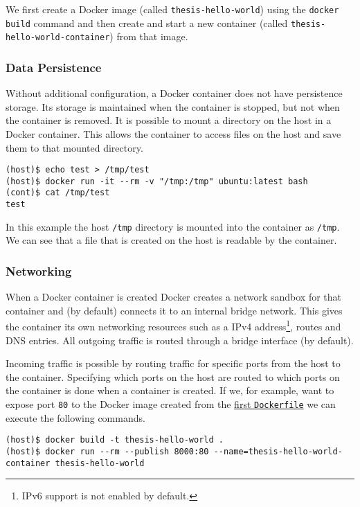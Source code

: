 We first create a Docker image (called \lstinline{thesis-hello-world}) using the \lstinline{docker build} command and then create and start a new container (called \lstinline{thesis-hello-world-container}) from that image.

\subsubsection{Data Persistence}
Without additional configuration, a Docker container does not have persistence storage. Its storage is maintained when the container is stopped, but not when the container is removed. It is possible to mount a directory on the host in a Docker container. This allows the container to access files on the host and save them to that mounted directory.

\begin{lstlisting}[caption={Bind mount example},label={docker:bindmount},captionpos=b]
(host)$ echo test > /tmp/test
(host)$ docker run -it --rm -v "/tmp:/tmp" ubuntu:latest bash
(cont)$ cat /tmp/test
test
\end{lstlisting}

In this example the host \lstinline{/tmp} directory is mounted into the container as \lstinline{/tmp}. We can see that a file that is created on the host is readable by the container.

\subsubsection{Networking}
When a Docker container is created Docker creates a network sandbox for that container and (by default) connects it to an internal bridge network. This gives the container its own networking resources such as a IPv4 address\footnote{IPv6 support is not enabled by default.}, routes and DNS entries. All outgoing traffic is routed through a bridge interface (by default).

\hfill

Incoming traffic is possible by routing traffic for specific ports from the host to the container.
Specifying which ports on the host are routed to which ports on the container is done when a container is created. If we, for example, want to expose port \lstinline{80} to the Docker image created from the \hyperref[dockerfile:simple]{first \lstinline{Dockerfile}} we can execute the following commands.

\begin{lstlisting}[caption={Creating a Docker container with exposed port},label={docker:publish},captionpos=b]
(host)$ docker build -t thesis-hello-world .
(host)$ docker run --rm --publish 8000:80 --name=thesis-hello-world-container thesis-hello-world
\end{lstlisting}

